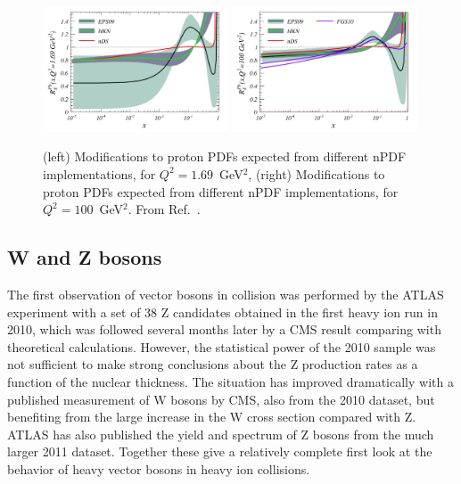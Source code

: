 \begin{figure}[t]
\begin{center}
\includegraphics[width=0.49\textwidth]{electroweak_figs/gluonsnew.pdf}
\includegraphics[width=0.49\textwidth]{electroweak_figs/gluonsnew100.pdf}
\caption[]{
(left) Modifications to proton PDFs expected from different nPDF implementations, for $Q^2=1.69$~GeV$^2$,
(right) Modifications to proton PDFs expected from different nPDF implementations, for $Q^2=100$~GeV$^2$.
From Ref.~\cite{Salgado:2011wc}.
}
\label{fig:pas:salgado}
\end{center}
\end{figure}

\subsection{W and Z bosons}

The first observation of vector bosons in \PbPb collision was performed by the ATLAS
experiment with a set of 38 Z candidates obtained in the first heavy ion run in 2010, which
was followed several months later by a CMS result comparing with theoretical calculations.
However, the statistical power of the 2010 sample was not sufficient to make strong conclusions
about the Z production rates as a function of the nuclear thickness.
The situation has improved dramatically with a published measurement of W bosons by CMS, also from the
2010 dataset, but benefiting from the large increase in the W cross section compared with Z.
ATLAS has also published the yield and spectrum of Z bosons from the much larger 2011 \PbPb dataset.
Together these give a relatively complete first look at the behavior of heavy vector bosons in
heavy ion collisions.


